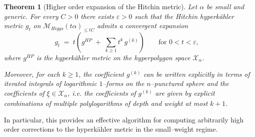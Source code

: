 \documentclass[12pt,a4paper]{amsart}
\newtheorem{theorem}{Theorem}[section]
\theoremstyle{definition}
\theoremstyle{remark}
\newtheorem{remark}[theorem]{Remark}
\begin{document}
\begin{theorem}[Higher order expansion of the Hitchin metric]
Let $\alpha$ be small and generic.
For every $C>0$
there exists
$\varepsilon>0$ such that  the Hitchin hyperk\"ahler
metric $g_t$ on 
$\mathcal M_{Higgs}(t\alpha)_{\le t C}$
admits a convergent expansion
\[
g_t \;=\; t\left(g^{HP} \;+\; \sum_{k\geq 1} t^k\, g^{(k)}\right)
\qquad \text{for } 0<t<\varepsilon,
\]
where $g^{HP}$ is the hyperk\"ahler metric on the hyperpolygon space $\mathcal X_\alpha$.

Moreover, for each $k\geq 1$, the coefficient $g^{(k)}$ 
can be written explicitly in terms of iterated integrals of logarithmic
$1$--forms on the $n$--punctured sphere and the coefficients of $\underline\xi\in \mathcal X_\alpha$, i.e. the coefficients of $g^{(k)}$
are given by explicit combinations of multiple polylogarithms of depth and
weight at most $k+1$.
\end{theorem}

In particular, this provides an effective algorithm for computing arbitrarily high
order corrections to the hyperk\"ahler metric in the small--weight regime.



\end{document}
